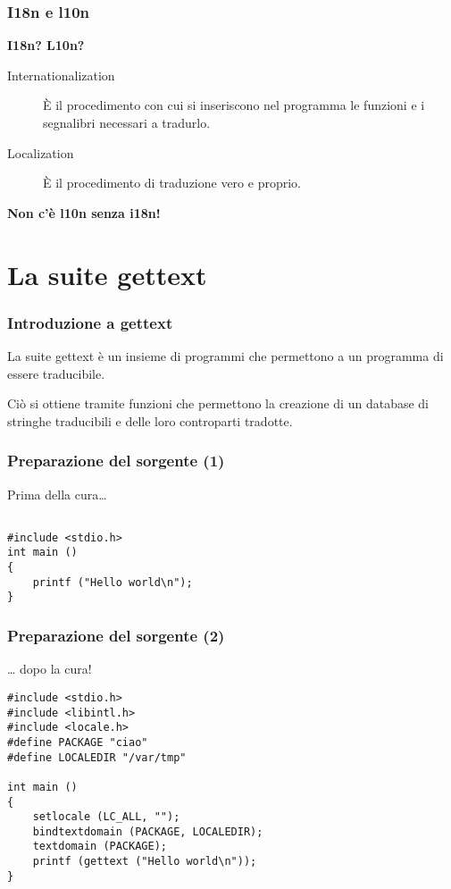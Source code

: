 \documentclass{beamer}
\begin{document}
\begin{frame}\frametitle{I18n e l10n}
\begin{center}
\textbf{I18n? L10n?}
\end{center}
\pause

\begin{description}
\item[Internationalization] È il procedimento con cui si inseriscono
nel programma le funzioni e i segnalibri necessari a tradurlo.
\pause
\item[Localization] È il procedimento di traduzione vero e proprio.
\end{description}
\pause

\begin{center}
\textbf{Non c'è l10n senza i18n!}
\end{center}
\end{frame}

\section{La suite gettext}

\begin{frame}\frametitle{Introduzione a gettext}
La suite gettext è un insieme di programmi che permettono a un
programma di essere traducibile.

Ciò si ottiene tramite funzioni che permettono la creazione di un
database di stringhe traducibili e delle loro controparti tradotte.
\end{frame}

\begin{frame}[containsverbatim]
\frametitle{Preparazione del sorgente (1)}
Prima della cura{\ldots} 

\begin{verbatim}

#include <stdio.h>
int main ()
{
    printf ("Hello world\n");
}

\end{verbatim}
\end{frame}

\begin{frame}
\frametitle{Preparazione del sorgente (2)}
{\ldots} dopo la cura!
\begin{verbatim}
#include <stdio.h>
#include <libintl.h>
#include <locale.h>
#define PACKAGE "ciao"
#define LOCALEDIR "/var/tmp"

int main ()
{
    setlocale (LC_ALL, "");
    bindtextdomain (PACKAGE, LOCALEDIR);
    textdomain (PACKAGE);
    printf (gettext ("Hello world\n"));
}
\end{verbatim}
\end{frame}
\end{document}
